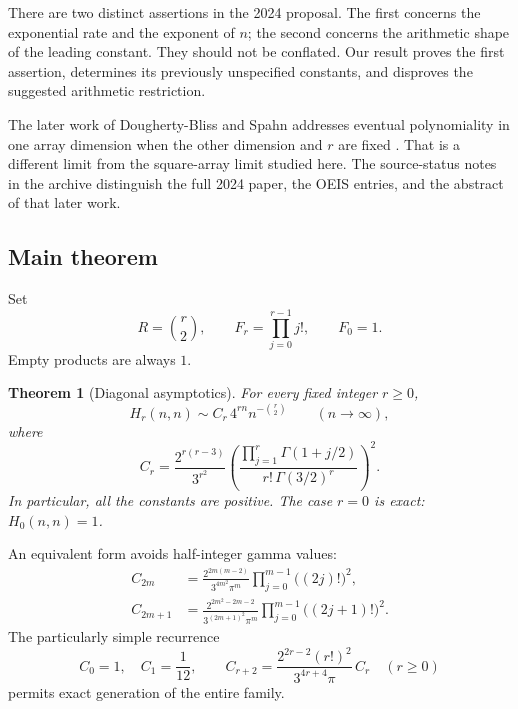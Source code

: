 \documentclass[11pt]{article}
\numberwithin{equation}{section}
\newtheorem{theorem}{Theorem}[section]
\theoremstyle{definition}
\begin{document}
There are two distinct assertions in the 2024 proposal. The first concerns the exponential rate and the exponent of $n$; the second concerns the arithmetic shape of the leading constant. They should not be conflated. Our result proves the first assertion, determines its previously unspecified constants, and disproves the suggested arithmetic restriction.

The later work of Dougherty-Bliss and Spahn addresses eventual polynomiality in one array dimension when the other dimension and $r$ are fixed \cite{DS}. That is a different limit from the square-array limit studied here. The source-status notes in the archive distinguish the full 2024 paper, the OEIS entries, and the abstract of that later work.

\subsection{Main theorem}
Set
\begin{equation}\label{eq:RFr}
 R=\binom r2,\qquad F_r=\prod_{j=0}^{r-1}j!,\qquad F_0=1.
\end{equation}
Empty products are always $1$.

\begin{theorem}[Diagonal asymptotics]\label{thm:main}
For every fixed integer $r\geq 0$,
\begin{equation}\label{eq:main}
 H_r(n,n)\sim C_r\,4^{rn}n^{-\binom r2}\qquad(n\to\infty),
\end{equation}
where
\begin{equation}\label{eq:Cr-gamma}
 \boxed{\displaystyle
 C_r=\frac{2^{r(r-3)}}{3^{r^2}}
 \left(\frac{\prod_{j=1}^{r}\Gamma(1+j/2)}
 {r!\,\Gamma(3/2)^r}\right)^2.}
\end{equation}
In particular, all the constants are positive. The case $r=0$ is exact: $H_0(n,n)=1$.
\end{theorem}

An equivalent form avoids half-integer gamma values:
\begin{align}
 C_{2m}&=\frac{2^{2m(m-2)}}{3^{4m^2}\pi^m}
        \prod_{j=0}^{m-1}\bigl((2j)!\bigr)^2,\label{eq:evenC}\\
 C_{2m+1}&=\frac{2^{2m^2-2m-2}}{3^{(2m+1)^2}\pi^m}
        \prod_{j=0}^{m-1}\bigl((2j+1)!\bigr)^2.\label{eq:oddC}
\end{align}
The particularly simple recurrence
\begin{equation}\label{eq:Crec}
 C_0=1,\quad C_1=\frac1{12},\qquad
 C_{r+2}=\frac{2^{2r-2}(r!)^2}{3^{4r+4}\pi}\,C_r
 \quad(r\geq0)
\end{equation}
permits exact generation of the entire family.
\end{document}
